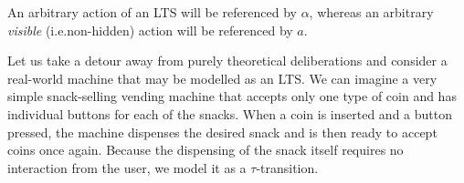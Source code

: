 \begin{isabellebody}
\begin{isamarkuptext}
An arbitrary action of an LTS will be referenced by $\alpha$, whereas an arbitrary \emph{visible} (i.e.\@ non-hidden) action will be referenced by $a$.%
\end{isamarkuptext}\isamarkuptrue%
%
\isadelimdocument
%
\endisadelimdocument
%
\isatagdocument
%
\isamarkuptrue%
%
\endisatagdocument
{\isafolddocument}%
%
\isadelimdocument
%
\endisadelimdocument
%
\begin{isamarkuptext}%
Let us take a detour away from purely theoretical deliberations and consider a real-world machine that may be modelled as an LTS. We can imagine a very simple snack-selling vending machine that accepts only one type of coin and has individual buttons for each of the snacks. When a coin is inserted and a button pressed, the machine dispenses the desired snack and is then ready to accept coins once again. Because the dispensing of the snack itself requires no interaction from the user, we model it as a $\tau$-transition.

\end{isamarkuptext}
\end{isabellebody}
